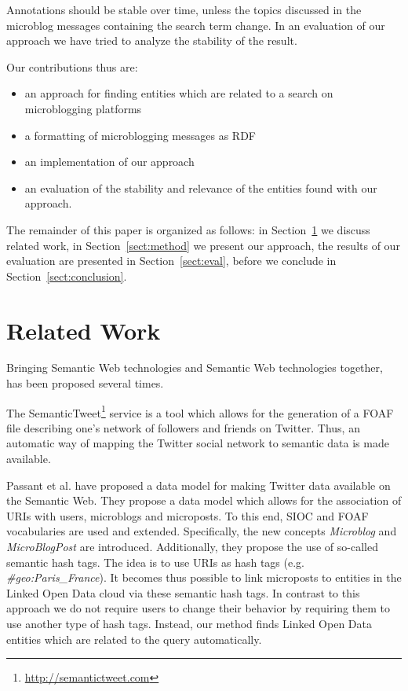 \documentclass{llncs}
\begin{document}
Annotations should be stable over time, unless the topics discussed in the microblog messages containing the search term change. In an evaluation of our approach we have tried to analyze the stability of the result.

Our contributions thus are:
\begin{itemize}
	\item an approach for finding entities which are related to a search on microblogging platforms
	\item a formatting of microblogging messages as RDF
	\item an implementation of our approach
	\item an evaluation of the stability and relevance of the entities found with our approach.
\end{itemize}

The remainder of this paper is organized as follows: in Section~\ref{sect:relWork} we discuss related work, in Section~\ref{sect:method} we present our approach, the results of our evaluation are presented in Section~\ref{sect:eval}, before we conclude in Section~\ref{sect:conclusion}.

\section{Related Work}
\label{sect:relWork}

Bringing Semantic Web technologies and Semantic Web technologies together, has been proposed several times.

The SemanticTweet\footnote{\url{http://semantictweet.com}} service is a tool which allows for the generation of a FOAF file describing one's network of followers and friends on Twitter. Thus, an automatic way of mapping the Twitter social network to semantic data is made available.

Passant et al. \cite{key:smob} have proposed a data model for making Twitter data available on the Semantic Web. They propose a data model which allows for the association of URIs with users, microblogs and microposts. To this end, SIOC and FOAF vocabularies are used and extended. Specifically, the new concepts \emph{Microblog} and \emph{MicroBlogPost} are introduced. Additionally, they propose the use of so-called semantic hash tags. The idea is to use URIs as hash tags (e.g. \emph{\#geo:Paris\_France}). It becomes thus possible to link microposts to entities in the Linked Open Data cloud via these semantic hash tags. 
In contrast to this approach we do not require users to change their behavior by requiring them to use another type of hash tags. Instead, our method finds Linked Open Data entities which are related to the query automatically.
\end{document}
